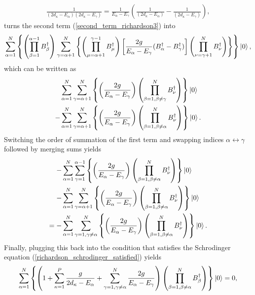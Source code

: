 \documentclass[10pt]{article}
\begin{document}
\begin{align}
\frac{1}{(2d_\kappa-E_\alpha)(2d_\kappa-E_\gamma)}
=
\frac{1}{E_\alpha-E_\gamma}
\left(
\frac{1}{(2d_\kappa-E_\alpha)}
-
\frac{1}{(2d_\kappa-E_\gamma)}
\right)
,\end{align}
turns the second term (\ref{second_term_richardson3}) into
\begin{align}
\label{second_term_richardson2}
\sum_{\alpha=1}^N
\left\{
\left(\prod_{\beta=1}^{\alpha-1}B^\dagger_\beta\right)
\sum_{\gamma=\alpha+1}^N
\left\{
\left(\prod_{\mu=\alpha+1}^{\gamma-1} B^\dagger_\mu\right)
\left[
\frac{2g}{E_\alpha-E_\gamma}(B^\dagger_\alpha-B^\dagger_\gamma)
\right]
\left(\prod_{\nu=\gamma+1}^NB^\dagger_\nu\right)
\right\}
\right\}
\ket{0}
,\end{align}
which can be written as
\begin{align}
&\sum_{\alpha=1}^N
\sum_{\gamma=\alpha+1}^N
\left\{
\left(
\frac{2g}{E_\alpha-E_\gamma}
\right)
\left(\prod_{\beta=1,\beta\neq\gamma}^NB^\dagger_\nu\right)
\right\}
\ket{0}
\nonumber
\\
-&
\sum_{\alpha=1}^N
\sum_{\gamma=\alpha+1}^N
\left\{
\left(
\frac{2g}{E_\alpha-E_\gamma}
\right)
\left(\prod_{\beta=1,\beta\neq\alpha}^NB^\dagger_\nu\right)
\right\}
\ket{0}
.\end{align}
Switching the order of summation of the first term and swapping indices $\alpha\leftrightarrow\gamma$ followed by merging sums yields
\begin{align}
-&
\sum_{\alpha=1}^N
\sum_{\gamma=1}^{\alpha-1}
\left\{
\left(
\frac{2g}{E_\alpha-E_\gamma}
\right)
\left(\prod_{\beta=1,\beta\neq\alpha}^NB^\dagger_\nu\right)
\right\}
\ket{0}
\nonumber
\\
-&
\sum_{\alpha=1}^N
\sum_{\gamma=\alpha+1}^N
\left\{
\left(
\frac{2g}{E_\alpha-E_\gamma}
\right)
\left(\prod_{\beta=1,\beta\neq\alpha}^NB^\dagger_\nu\right)
\right\}
\ket{0}
\\
=-&
\sum_{\alpha=1}^N
\sum_{\gamma=1,\gamma\neq\alpha}^N
\left\{
\left(
\frac{2g}{E_\alpha-E_\gamma}
\right)
\left(\prod_{\beta=1,\beta\neq\alpha}^NB^\dagger_\nu\right)
\right\}
\ket{0}
.\end{align}
Finally, plugging this back into the condition that satisfies the Schrodinger equation (\ref{richardson_schrodinger_satisfied}) yields
\begin{align}
\sum_{\alpha=1}^N
\left\{
\left(
1
+
\sum_{\kappa=1}^P
\frac{g}{2d_\kappa-E_\alpha}
+
\sum_{\gamma=1,\gamma\neq\alpha}^N
\frac{2g}{E_\alpha-E_\gamma}
\right)
\left(
\prod_{\beta=1,\beta\neq\alpha}^NB^\dagger_\beta
\right)
\right\}
\ket{0}
=0
,\end{align}
\end{document}
